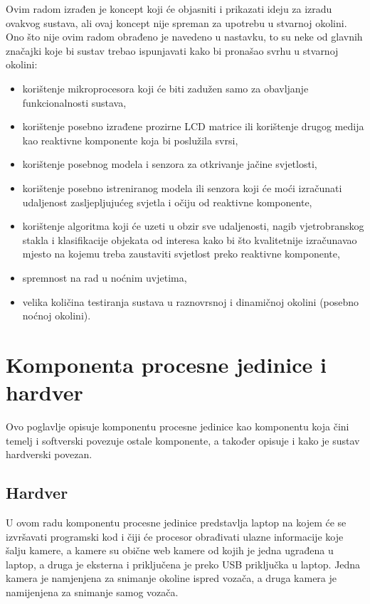 \documentclass{foi}
\begin{document}
Ovim radom izrađen je koncept koji će objasniti i prikazati ideju za izradu ovakvog sustava, ali ovaj koncept nije spreman za upotrebu u stvarnoj okolini. Ono što nije ovim radom obrađeno je navedeno u nastavku, to su neke od glavnih značajki koje bi sustav trebao ispunjavati kako bi pronašao svrhu u stvarnoj okolini:
\begin{itemize}[noitemsep]
    \item korištenje mikroprocesora koji će biti zadužen samo za obavljanje funkcionalnosti sustava,
    \item korištenje posebno izrađene prozirne LCD matrice ili korištenje drugog medija kao reaktivne komponente koja bi poslužila svrsi,
    \item korištenje posebnog modela i senzora za otkrivanje jačine svjetlosti,
    \item korištenje posebno istreniranog modela ili senzora koji će moći izračunati udaljenost zasljepljujućeg svjetla i očiju od reaktivne komponente,
    \item korištenje algoritma koji će uzeti u obzir sve udaljenosti, nagib vjetrobranskog stakla i klasifikacije objekata od interesa kako bi što kvalitetnije izračunavao mjesto na kojemu treba zaustaviti svjetlost preko reaktivne komponente,
    \item spremnost na rad u noćnim uvjetima,
    \item velika količina testiranja sustava u raznovrsnoj i dinamičnoj okolini (posebno noćnoj okolini).
\end{itemize}

\pagebreak
\section{Komponenta procesne jedinice i hardver}

Ovo poglavlje opisuje komponentu procesne jedinice kao komponentu koja čini temelj i softverski povezuje ostale komponente, a također opisuje i kako je sustav hardverski povezan.

\subsection{Hardver}
U ovom radu komponentu procesne jedinice predstavlja laptop na kojem će se izvršavati programski kod i čiji će procesor obrađivati ulazne informacije koje šalju kamere, a kamere su obične web kamere od kojih je jedna ugrađena u laptop, a druga je eksterna i priključena je preko USB priključka u laptop. Jedna kamera je namjenjena za snimanje okoline ispred vozača, a druga kamera je namijenjena za snimanje samog vozača.
\end{document}
